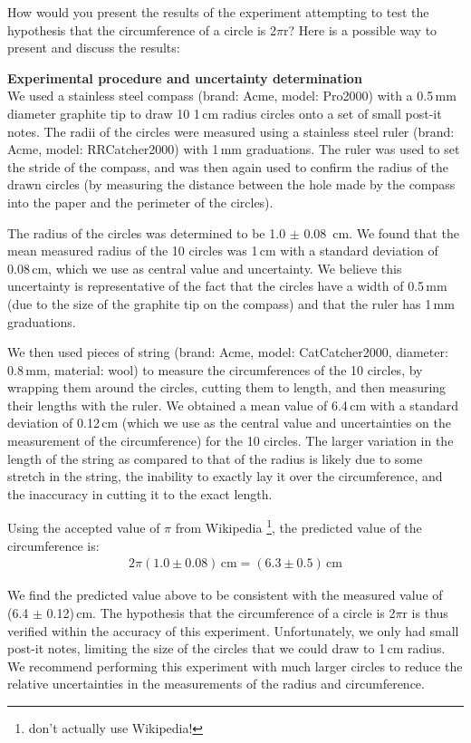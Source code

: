 \begin{example}{0pt}{How would you present the results of the experiment attempting to test the hypothesis that the circumference of a circle is 2$\pi$r?}{}
\label{ex:chapIntro_2pir}
Here is a possible way to present and discuss the results:

{\bf Experimental procedure and uncertainty determination}\\
We used a stainless steel compass (brand: Acme, model: Pro2000) with a 0.5\,mm diameter graphite tip to draw 10 1\,cm radius circles onto a set of small post-it notes. The radii of the circles were measured using a stainless steel ruler (brand: Acme, model: RRCatcher2000) with 1\,mm graduations. The ruler was used to set the stride of the compass, and was then again used to confirm the radius of the drawn circles (by measuring the distance between the hole made by the compass into the paper and the perimeter of the circles).

The radius of the circles was determined to be 1.0 $\pm$ 0.08 \,cm. We found that the mean measured radius of the 10 circles was 1\,cm with a standard deviation of 0.08\,cm, which we use as central value and uncertainty. We believe this uncertainty is representative of the fact that the circles have a width of 0.5\,mm (due to the size of the graphite tip on the compass) and that the ruler has 1\,mm graduations.  

We then used pieces of string (brand: Acme, model: CatCatcher2000, diameter: 0.8\,mm, material: wool) to measure the circumferences of the 10 circles, by wrapping them around the circles, cutting them to length, and then measuring their lengths with the ruler. We obtained a mean value of 6.4\,cm with a standard deviation of 0.12\,cm (which we use as the central value and uncertainties on the measurement of the circumference) for the 10 circles. The larger variation in the length of the string as compared to that of the radius is likely due to some stretch in the string, the inability to exactly lay it over the circumference, and the inaccuracy in cutting it to the exact length.

Using the accepted value of $\pi$ from Wikipedia \footnote{don't actually use Wikipedia!}, the predicted value of the circumference is:
\begin{align*}
2\pi(1.0\pm 0.08)\,\text{cm}=(6.3\pm 0.5)\,\text{cm}
\end{align*}

We find the predicted value above to be consistent with the measured value of (6.4 $\pm$ 0.12)\,cm. The hypothesis that the circumference of a circle is 2$\pi$r is thus verified within the accuracy of this experiment. Unfortunately, we only had small post-it notes, limiting the size of the circles that we could draw to 1\,cm radius. We recommend performing this experiment with much larger circles to reduce the relative uncertainties in the measurements of the radius and circumference.


\end{example}
